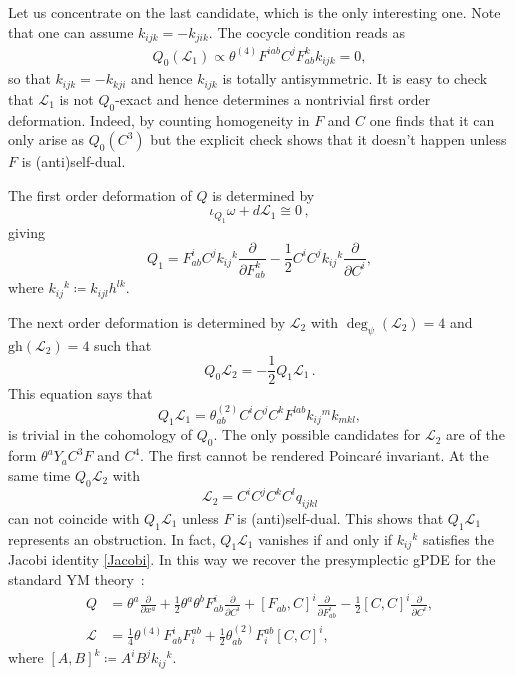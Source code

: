 \documentclass[a4paper,12pt]{article}
\numberwithin{equation}{section} %
\renewcommand{\simeq}{\cong}
\newcommand{\gh}[1]{\mathrm{gh}(#1)}
\renewcommand{\d}{\partial}
\newcommand{\hhalf}{\frac{1}{2}}
\def\cL{\mathcal{L}}
\newcommand{\pdv}[1]{\frac{\d}{\d #1}}
\newcommand{\h}{\cL}
\begin{document}
Let us concentrate on the last candidate, which is the only interesting one. Note that one can assume $ k_{ijk} = - k_{jik} $. The cocycle condition reads as 
\begin{align}
	Q_0(\cL_1) \propto \theta^{(4)}F^{iab}C^j F^k_{ab} k_{ijk} = 0,
\end{align}
so that $k_{ijk} = -k_{kji}$ and hence $k_{ijk}$ is totally antisymmetric. It is easy to check that $\cL_1$ is not $Q_0$-exact and hence determines a nontrivial first order deformation. Indeed, by counting homogeneity in $F$ and $C$ one finds that it can only arise as $Q_0(C^3)$ but the explicit check shows that it doesn't happen unless $F$ is (anti)self-dual.

The first order deformation of $Q$ is determined by 
\begin{equation}
	\iota_{Q_1}\omega + d\h_1 \simeq 0\,,
\end{equation}
giving
\begin{equation}
	Q_1 =  F^{i}_{ab}C^j k_{ij}{}^k\pdv{F^k_{ab}} -\hhalf C^iC^j k_{ij}{}^k\pdv{C^i},
\end{equation}
where $k_{ij}{}^k \coloneqq k_{ijl} h^{lk}$.

The next order deformation is determined by  $\h_2$ with $ \deg_\psi (\h_2) = 4 $ and $ \gh{\h_2} = 4 $ such that
\begin{equation}
	Q_0 \h_2 = -\frac{1}{2} Q_1 \h_1  \label{eq_max_i2}\,.
\end{equation}
This equation says that
\begin{equation}
	Q_1 \h_1 = \theta_{ab}^{(2)} C^i C^j C^k F^{lab}k_{ij}{}^m k_{mkl}, \label{eq_ym_Q1L1}
\end{equation}
is trivial in the cohomology of $Q_0$.  The only possible candidates for $\cL_2$ are of the form $ \theta^a Y_a C^3 F $ and $ C^4 $. The first cannot be rendered Poincar\'e invariant. At the same time $Q_0\cL_2$ with 
\begin{equation}
	\cL_2 =C^iC^jC^kC^l q_{ijkl}
\end{equation}
can not coincide with $Q_1\cL_1$ unless $F$ is (anti)self-dual. This shows that  $Q_1\cL_1$ represents an obstruction.
In fact, $Q_1\cL_1$ vanishes if and only if $k_{ij}{}^k$ satisfies the Jacobi identity \eqref{Jacobi}. In this way we recover the presymplectic gPDE for the standard YM theory~\cite{Grigoriev:2022zlq,Dneprov:2022jyn}:
\begin{align}
	Q &= \theta^a \pdv{x^a} + \frac{1}{2}\theta^a\theta^b F^i_{ab}\pdv{C^i} + [F_{ab},C]^i\pdv{F^i_{ab}} - \frac{1}{2} [C,C]^i\pdv{C^i} \label{result_maxwell_Q},  \\
	\h  &= \frac{1}{4}\theta^{(4)}F^i_{ab} F_i^{ab} + \hhalf  \theta^{(2)}_{ab} F_i^{ab}  [C,C]^i  \label{result_maxwell_L},
\end{align}
where $[A,B]^k \coloneqq A^i B^j k_{ij}{}^{k}$.
\end{document}
